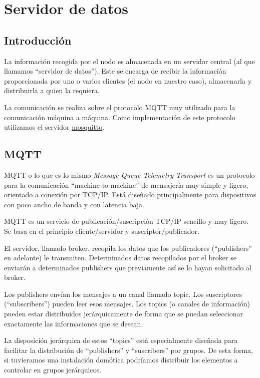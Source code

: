 \cleardoublepage

\chapter{Servidor de datos}
\label{makereference3}

\section{Introducción}
\label{makereference3.1}
La información recogida por el nodo es almacenada en un servidor central (al que llamamos ``servidor de datos''). Este se encarga de recibir la información proporcionada por uno o varios clientes (el nodo en nuestro caso), almacenarla y distribuirla a quien la requiera.

La comunicación se realiza sobre el protocolo MQTT muy utilizado para la comunicación máquina a máquina. Como implementación de este protocolo utilizamos el servidor \href{https://mosquitto.org/}{mosquitto}.

\section{MQTT}
\label{makereference3.2}
MQTT o lo que es lo mismo \textit{Message Queue Telemetry Transport} es un protocolo para la comunicación ``machine-to-machine'' de mensajería muy simple y ligero, orientado a conexión por TCP/IP. Está diseñado principalmente para dispositivos con poco ancho de banda y con latencia baja.

MQTT es un servicio de publicación/suscripción TCP/IP sencillo y muy ligero. Se basa en el principio cliente/servidor y suscriptor/publicador.

El servidor, llamado broker, recopila los datos que los publicadores (``publishers'' en adelante) le transmiten. Determinados datos recopilados por el broker se enviarán a determinados publishers que previamente así se lo hayan solicitado al broker.

Los publishers envían los mensajes a un canal llamado topic. Los suscriptores (``subscribers'') pueden leer esos mensajes. Los topics (o canales de información) pueden estar distribuidos jerárquicamente de forma que se puedan seleccionar exactamente las informaciones que se desean.

La disposición jerárquica de estos ``topics'' está especialmente diseñada para facilitar la distribución de ``publishers'' y ``suscribers'' por grupos. De esta forma, si tuvieramos una instalación domótica podríamos distribuir los elementos a controlar en grupos jerárquicos.

